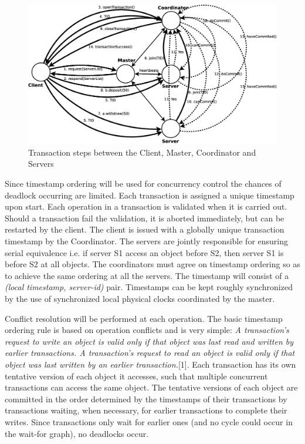 \documentclass[times, 10pt,twocolumn]{article}
\begin{document}
\begin{figure}
\centering
\includegraphics[scale=0.2]{transaction.eps}
\caption{Transaction steps between the Client, Master, Coordinator and Servers}
\label{fig:transa}
\end{figure}



\label{subsec:dldetect}
Since timestamp ordering will be used for concurrency control the chances of deadlock occurring are limited.
Each transaction is assigned a unique timestamp upon start. Each operation in a transaction is validated when it is carried out.
Should a transaction fail the validation, it is aborted immediately, but can be restarted by the client. The client is issued with a globally unique transaction timestamp by the Coordinator. The servers are jointly responsible for ensuring serial equivalence i.e. if server S1 access an object before S2, then server S1 is before S2 at all objects. The coordinators must agree on timestamp ordering so as to achieve the same ordering at all the servers. The timestamp will consist of a {\it (local timestamp, server-id) } pair. Timestamps can be kept roughly synchronized by the use of synchronized local physical clocks coordinated by the master.

Conflict resolution will be performed at each operation.
The basic timestamp ordering rule is based on operation conflicts and is very simple:
{\it A transaction’s request to write an object is valid only if that object was last read and written by earlier transactions. A transaction’s request to read an object is valid only if that object was
last written by an earlier transaction.}[1]. Each transaction has its own tentative version of each object it accesses, such that multiple concurrent transactions can access the same object. The tentative
versions of each object are committed in the order determined by the timestamps of their transactions by transactions waiting, when necessary, for earlier transactions to complete their writes.
Since transactions only wait for earlier ones (and no cycle could occur in the wait-for graph), no deadlocks occur.
\end{document}
